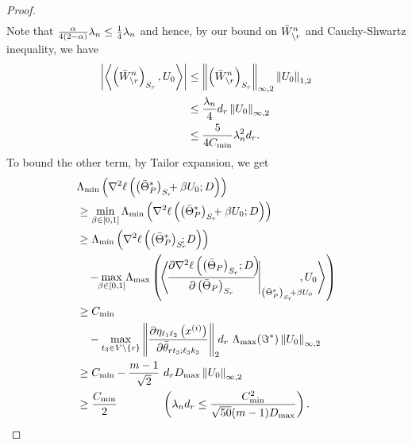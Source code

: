 \begin{proof}
\begin{equation}
\begin{aligned}
\end{aligned}
\nonumber
\end{equation}
Note that $\frac{\alpha}{4(2-\alpha)}\lambda_n\leq\frac{1}{4}\lambda_n$ and hence, by our bound on $\bar{W}^n_{\backslash r}$ and Cauchy-Shwartz inequality, we have
\begin{equation}
\begin{aligned}
\left|\left<\left(\bar{W}^n_{\backslash r}\right)_{S_{r}},U_0\right>\right| &\leq\left\|\left(\bar{W}^n_{\backslash r}\right)_{S_{r}}\right\|_{\infty,2} \left\|U_0\right\|_{1,2}\\ &\leq\frac{\lambda_n}{4}d_{r}\left\|U_0\right\|_{\infty,2}\\
&\leq\frac{5}{4C_{\min}}\lambda_n^2d_{r}.
\end{aligned}
\nonumber
\end{equation}
To bound the other term, by Tailor expansion, we get
\begin{equation}
\begin{aligned}
&\Lambda_{\min}\left(\nabla^2\ell\left(\left(\bar{\Theta}^*_P\right)_{\support_\svert}\!\!\! +\beta U_0;\Data\right)\right)\\
&\geq \min_{\beta\in[0,1]}\Lambda_{\min}\left(\nabla^2\ell\left(\left(\bar{\Theta}^*_P\right)_{\support_\svert} \!\!\!+\beta U_0;D\right)\right)\\
&\geq \Lambda_{\min}\left(\nabla^2\ell\left(\left(\bar{\Theta}^*_P\right)_{\support_\svert}\!\!\!\!;D\right)\right)\\ &\quad-\!\!\max_{\beta\in[0,1]}\!\Lambda_{\max} \left(\!\tr{\!\frac{\partial\nabla^2\ell\left(\left(\bar{\Theta}_P\right)_{\support_\svert}\!;D\right)\!\!\!} {\partial\left(\bar{\Theta}_P\right)_{\support_\svert}}\,\Biggr|_{\left(\bar{\Theta}^*_P\right)_{\support_\svert}\!\! +\beta U_0\!\!\!\!}\!\!\!\!} {U_0}\right)\\
&\geq C_{\min}\\ &\quad -  \max_{t_3\in\vertex\backslash\{\svert\}}\norm{\frac{\partial\eta_{\ell_1\ell_2}\left(x^{(i)}\right)}{\partial\bar{\theta}_{\svert t_3;\ell_3k_3}}}{2}\!\!d_\svert\,\, \Lambda_{\max}(\Im^*) \norm{U_0}{\infty,2}\\
&\geq C_{\min} - \frac{m-1}{\sqrt{2}}\,\, d_\svert D_{\max}\norm{U_0}{\infty,2}\\ &\geq\frac{C_{\min}}{2} \qquad\qquad\left(\regpar_nd_\svert\leq\frac{C_{\min}^2}{\sqrt{50}(m-1)D_{\max}}\right).
\end{aligned}
\label{sim_analysis_general}
\end{equation}

\end{proof}

